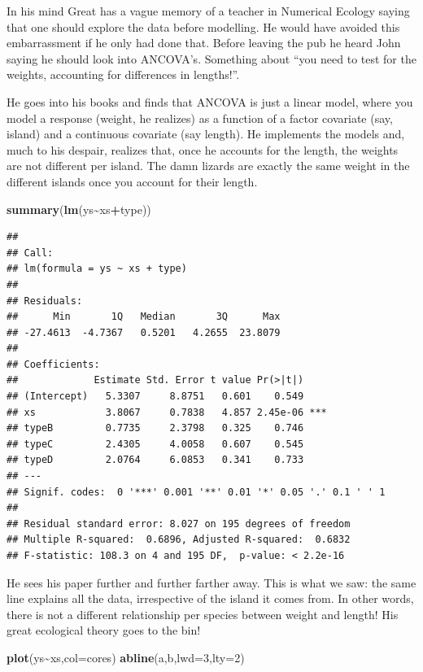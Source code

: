 \documentclass[
]{book}
\newenvironment{Shaded}{\begin{snugshade}}{\end{snugshade}}
\newcommand{\AttributeTok}[1]{\textcolor[rgb]{0.13,0.29,0.53}{#1}}
\newcommand{\DecValTok}[1]{\textcolor[rgb]{0.00,0.00,0.81}{#1}}
\newcommand{\FunctionTok}[1]{\textcolor[rgb]{0.13,0.29,0.53}{\textbf{#1}}}
\newcommand{\NormalTok}[1]{#1}
\newcommand{\SpecialCharTok}[1]{\textcolor[rgb]{0.81,0.36,0.00}{\textbf{#1}}}
\begin{document}
In his mind Great has a vague memory of a teacher in Numerical Ecology saying that one should explore the data before modelling. He would have avoided this embarrassment if he only had done that. Before leaving the pub he heard John saying he should look into ANCOVA's. Something about ``you need to test for the weights, accounting for differences in lengths!''.

He goes into his books and finds that ANCOVA is just a linear model, where you model a response (weight, he realizes) as a function of a factor covariate (say, island) and a continuous covariate (say length). He implements the models and, much to his despair, realizes that, once he accounts for the length, the weights are not different per island. The damn lizards are exactly the same weight in the different islands once you account for their length.

\begin{Shaded}
\begin{Highlighting}[]
\FunctionTok{summary}\NormalTok{(}\FunctionTok{lm}\NormalTok{(ys}\SpecialCharTok{\textasciitilde{}}\NormalTok{xs}\SpecialCharTok{+}\NormalTok{type))}
\end{Highlighting}
\end{Shaded}

\begin{verbatim}
## 
## Call:
## lm(formula = ys ~ xs + type)
## 
## Residuals:
##      Min       1Q   Median       3Q      Max 
## -27.4613  -4.7367   0.5201   4.2655  23.8079 
## 
## Coefficients:
##             Estimate Std. Error t value Pr(>|t|)    
## (Intercept)   5.3307     8.8751   0.601    0.549    
## xs            3.8067     0.7838   4.857 2.45e-06 ***
## typeB         0.7735     2.3798   0.325    0.746    
## typeC         2.4305     4.0058   0.607    0.545    
## typeD         2.0764     6.0853   0.341    0.733    
## ---
## Signif. codes:  0 '***' 0.001 '**' 0.01 '*' 0.05 '.' 0.1 ' ' 1
## 
## Residual standard error: 8.027 on 195 degrees of freedom
## Multiple R-squared:  0.6896, Adjusted R-squared:  0.6832 
## F-statistic: 108.3 on 4 and 195 DF,  p-value: < 2.2e-16
\end{verbatim}

He sees his paper further and further farther away. This is what we saw: the same line explains all the data, irrespective of the island it comes from. In other words, there is not a different relationship per species between weight and length! His great ecological theory goes to the bin!

\begin{Shaded}
\begin{Highlighting}[]
\FunctionTok{plot}\NormalTok{(ys}\SpecialCharTok{\textasciitilde{}}\NormalTok{xs,}\AttributeTok{col=}\NormalTok{cores)}
\FunctionTok{abline}\NormalTok{(a,b,}\AttributeTok{lwd=}\DecValTok{3}\NormalTok{,}\AttributeTok{lty=}\DecValTok{2}\NormalTok{)}
\end{Highlighting}
\end{Shaded}
\end{document}
